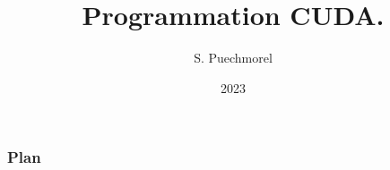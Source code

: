 \documentclass{beamer}
\title{Programmation CUDA.}
\author{S. Puechmorel}
\date{2023}
\begin{document}
\begin{frame}
    \titlepage

\end{frame}
\begin{frame}
  \frametitle{Plan}
\tableofcontents
\end{frame}

\end{document}
